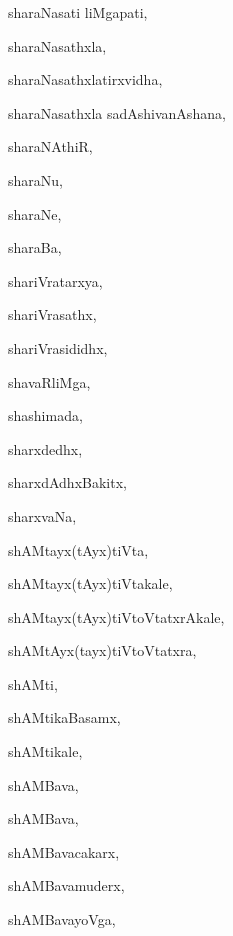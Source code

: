 \begin{multicols}{3}
{\noindent
{sharaNasati liMgapati}, \pageref{sharaNasatiliMgapati}

\noindent
{sharaNasathxla}, \pageref{sharaNasathxla}

\noindent
{sharaNasathxlatirxvidha}, \pageref{sharaNasathxlatirxvidha}

\noindent
{sharaNasathxla sadAshivanAshana}, \pageref{sharaNasathxla sadAshivanAshana}

\noindent
{sharaNAthiR}, \pageref{sharaNAthiR}

\noindent
{sharaNu}, \pageref{sharaNu}

\noindent
{sharaNe}, \pageref{sharaNe}

\noindent
{sharaBa}, \pageref{sharaBa}

\noindent
{shariVratarxya}, \pageref{shariVratarxya}

\noindent
{shariVrasathx}, \pageref{shariVrasathx}

\noindent
{shariVrasididhx}, \pageref{shariVrasididhx}

\noindent
{shavaRliMga}, \pageref{shavaRliMga}

\noindent
{shashimada}, \pageref{shashimada}

\noindent
{sharxdedhx}, \pageref{sharxdedhx}

\noindent
{sharxdAdhxBakitx}, \pageref{sharxdAdhxBakitx}

\noindent
{sharxvaNa}, \pageref{sharxvaNa}

\noindent
{shAMtayx(tAyx)tiVta}, \pageref{shAMtayxtAyxtiVta}

\noindent
{shAMtayx(tAyx)tiVtakale}, \pageref{shAMtayxtAyxtiVtakale}

\noindent
{shAMtayx(tAyx)tiVtoVtatxrAkale}, \pageref{shAMtayxtAyxtiVtoVtatxrAkale}

\noindent
{shAMtAyx(tayx)tiVtoVtatxra}, \pageref{shAMtAyxtayxtiVtoVtatxra}

\noindent
{shAMti}, \pageref{shAMti}

\noindent
{shAMtikaBasamx}, \pageref{shAMtikaBasamx}

\noindent
{shAMtikale}, \pageref{shAMtikale}

\noindent
{shAMBava}, \pageref{shAMBava1}

\noindent
{shAMBava}, \pageref{shAMBava2}

\noindent
{shAMBavacakarx}, \pageref{shAMBavacakarx}

\noindent
{shAMBavamuderx}, \pageref{shAMBavamuderx}

\noindent
{shAMBavayoVga}, \pageref{shAMBavayoVga}

}
\end{multicols}
